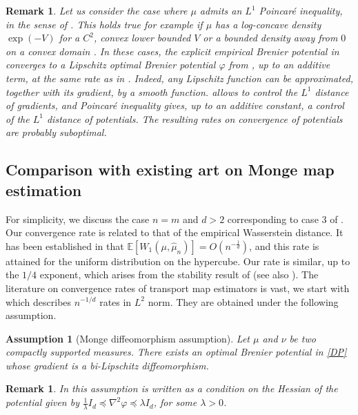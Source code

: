 \documentclass[11pt]{article}
\newtheorem{remark}[lemma]{Remark}
\newtheorem{assumption}{Assumption}
\newcommand{\1}{\mathbbm{1}}
\numberwithin{equation}{section}
\begin{document}
\begin{remark}
    Let us consider the case where $\mu$ admits an $L^1$ Poincar\'e inequality, in the sense of \cite[Equation (1.2)]{bakry2008simple}. This holds true for example if $\mu$ has a log-concave density $\exp(-V)$ for a $C^2$, convex lower bounded $V$ \cite[Corollary 1.9]{bakry2008simple} or a bounded density away from $0$ on a convex domain \cite{acosta2004optimal}. In these cases, the explicit empirical Brenier potential in  converges to a Lipschitz optimal Brenier potential $\varphi$ from , up to an additive term, at the same rate as in . Indeed, any Lipschitz function can be approximated, together with its gradient, by a smooth function.  allows to control the $L^1$ distance of gradients, and Poincar\'e inequality gives, up to an additive constant, a control of the $L^1$ distance of potentials. The resulting rates on convergence of potentials are probably suboptimal.
    \label{rem:poincare}
\end{remark}

\subsection{Comparison with existing art on Monge map estimation}
\label{sec:comparisonStat}

For simplicity,  we discuss the case $n=m$ and $d>2$ corresponding to case 3 of . Our convergence rate is related to that of the empirical Wasserstein distance. It has been established in \cite{fournier2015rate} that $\mathbb{E}[W_1(\mu,\hat{\mu}_n)]=O\left( n^{-\frac{1}{d}}\right)$, and this rate is attained for the uniform distribution on the hypercube. Our rate is similar, up to the $1/4$ exponent, which arises from the stability result of  (see also ). The literature on convergence rates of transport map estimators is vast, we start with \cite{manole2024plugin} which describes $n^{-1/d}$ rates in $L^2$ norm. They are obtained under the following assumption. 
\begin{assumption}[Monge diffeomorphism assumption]
Let $\mu$ and $\nu$ be two compactly supported measures. There exists an optimal Brenier potential in \eqref{DP} whose gradient is a bi-Lipschitz diffeomorphism.
    \label{assumption:bi_lip_diffeo}
\end{assumption}
\begin{remark}\label{rem:bi_lip_diffeo}
    In \cite{manole2024plugin} this assumption is written as a condition on the Hessian of the potential given by $\frac{1}{\lambda}I_d\preceq \nabla^2\varphi \preceq \lambda I_d $, for some $\lambda>0$.
\end{remark}
\end{document}

